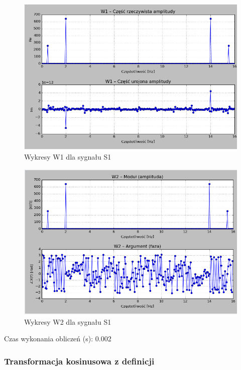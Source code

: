 \documentclass{article}
\begin{document}
{                \FloatBarrier
                \begin{figure}[h!]
                    \centering
                    \includegraphics[width=1\textwidth]{img/w1s1_2.png}
                    \caption{Wykresy W1 dla sygnału S1}
                \end{figure}

                \begin{figure}[h!]
                    \centering
                    \includegraphics[width=1\textwidth]{img/w2s1_2.png}
                    \caption{Wykresy W2 dla sygnału S1}
                \end{figure}
                \FloatBarrier

                Czas wykonania obliczeń (s): 0.002

            \subsubsection{Transformacja kosinusowa z definicji}

}
\end{document}
